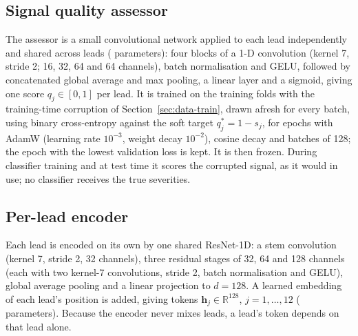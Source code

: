 \subsection{Signal quality assessor}
\label{sec:method-sqa}
The assessor is a small convolutional network applied to each lead independently and shared across leads
(\paramsSqa{} parameters): four blocks of a 1-D convolution (kernel 7, stride 2; 16, 32, 64 and 64 channels),
batch normalisation and GELU, followed by concatenated global average and max pooling, a linear layer and a
sigmoid, giving one score $q_j\in[0,1]$ per lead. It is trained on the training folds with the training-time
corruption of Section~\ref{sec:data-train}, drawn afresh for every batch, using binary cross-entropy against the
soft target $q^\ast_j=1-s_j$, for \sqaEpochs{} epochs with AdamW (learning rate $10^{-3}$, weight decay
$10^{-2}$), cosine decay and batches of 128; the epoch with the lowest validation loss is kept. It is then
frozen. During classifier training and at test time it scores
the corrupted signal, as it would in use; no classifier receives the true severities.

\subsection{Per-lead encoder}
\label{sec:method-encoder}
Each lead is encoded on its own by one shared ResNet-1D: a stem convolution (kernel 7, stride 2, 32 channels),
three residual stages of 32, 64 and 128 channels (each with two kernel-7 convolutions, stride 2, batch
normalisation and GELU), global average pooling and a linear projection to $d=128$. A learned embedding of each
lead's position is added, giving tokens $\mathbf{h}_j\in\mathbb{R}^{128}$, $j=1,\dots,12$ (\paramsLgEncoder{}
parameters). Because the encoder never mixes leads, a lead's token depends on that lead alone.

